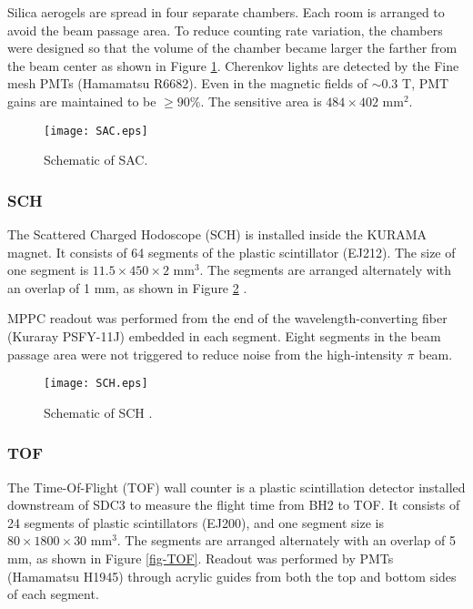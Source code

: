 Silica aerogels are spread in four separate chambers. Each room is arranged to avoid the beam passage area.
To reduce counting rate variation, the chambers were designed so that the volume of the chamber became larger the farther from the beam center as shown in Figure \ref{fig-SAC}. Cherenkov lights are detected by the Fine mesh PMTs (Hamamatsu R6682). Even in the magnetic fields of $\sim0.3$ T, PMT gains are maintained to be $\geq90$\%. The sensitive area is $484\times402$ mm$^2$.

\begin{figure}[!h]
 \begin{center}
   \texttt{[image: SAC.eps]}
   \caption{Schematic of SAC.}
   \label{fig-SAC}
 \end{center}
\end{figure}

\subsubsection{SCH}
The Scattered Charged Hodoscope (SCH) is installed inside the KURAMA magnet. It consists of 64 segments of the plastic scintillator (EJ212). The size of one segment is $11.5\times450\times2$ mm$^3$. The segments are arranged alternately with an overlap of 1 mm, as shown in Figure \ref{fig-SCH} \cite{Nana-D}. 

MPPC readout was performed from the end of the wavelength-converting fiber (Kuraray PSFY-11J) embedded in each segment. Eight segments in the beam passage area were not triggered to reduce noise from the high-intensity $\pi$ beam.

\begin{figure}[!h]
 \begin{center}
   \texttt{[image: SCH.eps]}
   \caption{Schematic of SCH \cite{Nana-D}.}
   \label{fig-SCH}
 \end{center}
\end{figure}

%
\subsubsection{TOF}
The Time-Of-Flight (TOF) wall counter is a plastic scintillation detector installed downstream of SDC3 to measure the flight time from BH2 to TOF. It consists of 24 segments of plastic scintillators (EJ200), and one segment size is $80\times1800\times30$ mm$^3$. The segments are arranged alternately with an overlap of 5 mm, as shown in Figure \ref{fig-TOF}. Readout was performed by PMTs (Hamamatsu H1945) through acrylic guides from both the top and bottom sides of each segment. 


